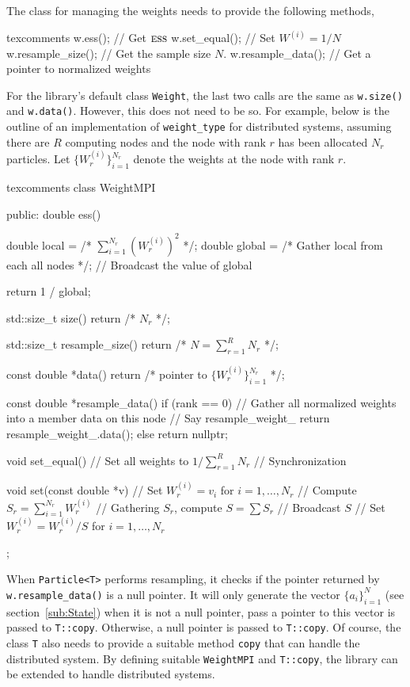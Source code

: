 The class for managing the weights needs to provide the following methods,
\begin{cppcode*}{texcomments}
  w.ess();           // Get $\text{\normalfont\textsc{ess}}$
  w.set_equal();     // Set $W^{(i)} = 1/N$
  w.resample_size(); // Get the sample size $N$.
  w.resample_data(); // Get a pointer to normalized weights
\end{cppcode*}
For the library's default class \verb|Weight|, the last two calls are the same
as \verb|w.size()| and \verb|w.data()|. However, this does not need to be so.
For example, below is the outline of an implementation of \verb|weight_type|
for distributed systems, assuming there are $R$ computing nodes and the node
with rank $r$ has been allocated $N_r$ particles. Let
$\{W_r^{(i)}\}_{i=1}^{N_r}$ denote the weights at the node with rank $r$.
\begin{cppcode*}{texcomments}
  class WeightMPI
  {
      public:
      double ess()
      {
          double local = /* $\sum_{i=1}^{N_r}(W_r^{(i)})^2$ */;
          double global = /* Gather local from each all nodes */;
          // Broadcast the value of global

          return 1 / global;
      }

      std::size_t size() { return /* $N_r$ */; }

      std::size_t resample_size() { return /* $N = \sum_{r=1}^R N_r$ */; }

      const double *data()
      {
          return /* pointer to $\{W_r^{(i)}\}_{i=1}^{N_r}$ */;
      }

      const double *resample_data()
      {
          if (rank == 0) {
              // Gather all normalized weights into a member data on this node
              // Say resample\_weight\_
              return resample_weight_.data();
          } else {
              return nullptr;
          }
      }

      void set_equal()
      {
          // Set all weights to $1 / \sum_{r=1}^R N_r$
          // Synchronization
      }

      void set(const double *v)
      {
          // Set $W_r^{(i)} = v_i$ for $i = 1,\dots,N_r$
          // Compute $S_r = \sum_{i=1}^{N_r} W_r^{(i)}$
          // Gathering $S_r$, compute $S = \sum S_r$
          // Broadcast $S$
          // Set $W_r^{(i)} = W_r^{(i)} / S$ for $i = 1,\dots,N_r$
      }
  };
\end{cppcode*}
When \verb|Particle<T>| performs resampling, it checks if the pointer returned
by \verb|w.resample_data()| is a null pointer. It will only generate the vector
$\{a_i\}_{i=1}^N$ (see section~\ref{sub:State}) when it is not a null pointer,
pass a pointer to this vector is passed to \verb|T::copy|. Otherwise, a null
pointer is passed to \verb|T::copy|. Of course, the class \verb|T| also needs
to provide a suitable method \verb|copy| that can handle the distributed
system. By defining suitable \verb|WeightMPI| and \verb|T::copy|, the library
can be extended to handle distributed systems.

